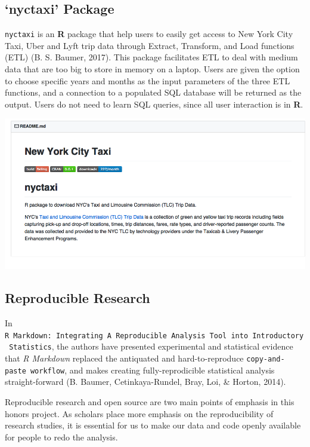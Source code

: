 \documentclass[12pt,twoside]{reedthesis}
\theoremstyle{definition}
\theoremstyle{definition}
\theoremstyle{definition}
\theoremstyle{remark}
\begin{document}
\subsection{\texorpdfstring{`nyctaxi'
Package}{nyctaxi Package}}\label{nyctaxi-package}

\texttt{nyctaxi} is an \textbf{R} package that help users to easily get
access to New York City Taxi, Uber and Lyft trip data through Extract,
Transform, and Load functions (ETL) (B. S. Baumer, 2017). This package
facilitates ETL to deal with medium data that are too big to store in
memory on a laptop. Users are given the option to choose specific years
and months as the input parameters of the three ETL functions, and a
connection to a populated SQL database will be returned as the output.
Users do not need to learn SQL queries, since all user interaction is in
\textbf{R}.
\begin{center}\includegraphics[width=5.88in]{figure/nyctaxi-page} \end{center}

\subsection{Reproducible Research}\label{reproducible-research}

In
\texttt{R\ Markdown:\ Integrating\ A\ Reproducible\ Analysis\ Tool\ into\ Introductory\ Statistics},
the authors have presented experimental and statistical evidence that
\emph{R Markdown} replaced the antiquated and hard-to-reproduce
\texttt{copy-and-paste\ workflow}, and makes creating fully-reprodicible
statistical analysis straight-forward (B. Baumer, Cetinkaya-Rundel,
Bray, Loi, \& Horton, 2014).

Reproducible research and open source are two main points of emphasis in
this honors project. As scholars place more emphasis on the
reproducibility of research studies, it is essential for us to make our
data and code openly available for people to redo the analysis.
\end{document}
